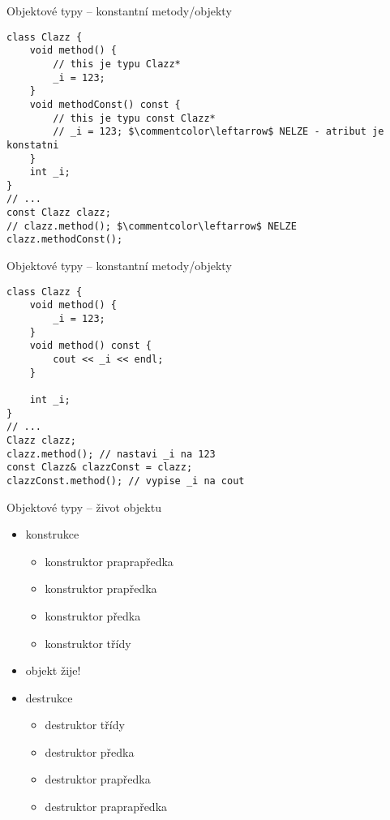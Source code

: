 \begin{frame}[fragile]
\begin{exampleblock}{Objektové typy -- konstantní metody/objekty} 
\begin{lstlisting}
class Clazz {
	void method() {
		// this je typu Clazz*
		_i = 123;
	}
	void methodConst() const {
		// this je typu const Clazz*
		// _i = 123; $\commentcolor\leftarrow$ NELZE - atribut je konstatni
	}
	int _i;
}
// ...
const Clazz clazz;
// clazz.method(); $\commentcolor\leftarrow$ NELZE
clazz.methodConst();
\end{lstlisting}
\end{exampleblock}
\end{frame}

\begin{frame}[fragile]
\begin{exampleblock}{Objektové typy -- konstantní metody/objekty} 
\begin{lstlisting}
class Clazz {
	void method() {
		_i = 123;
	}
	void method() const {
		cout << _i << endl;
	}
	
	int _i;
}
// ...
Clazz clazz;
clazz.method(); // nastavi _i na 123
const Clazz& clazzConst = clazz;
clazzConst.method(); // vypise _i na cout\end{lstlisting}
\end{exampleblock}
\end{frame}

\begin{frame}[fragile]
\begin{block}{Objektové typy -- život objektu} 
\begin{itemize}
\item konstrukce
\begin{itemize}
\item konstruktor praprapředka
\item konstruktor prapředka
\item konstruktor předka
\item konstruktor třídy
\end{itemize}
\item objekt žije!
\item destrukce
\begin{itemize}
\item destruktor třídy
\item destruktor předka
\item destruktor prapředka
\item destruktor praprapředka
\end{itemize}
\end{itemize}

\end{block}
\end{frame}


